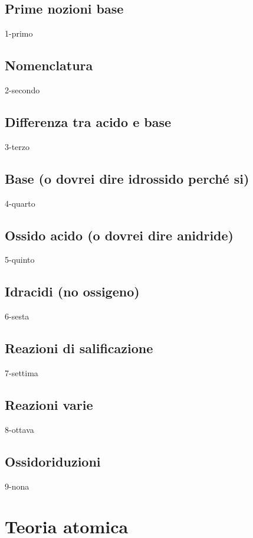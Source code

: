 \documentclass[openany,12pt]{book}%
\begin{document}
\section{Prime nozioni base}%
{1-primo}

\section{Nomenclatura}
{2-secondo}

\section{Differenza tra acido e base}
{3-terzo}

\section{Base (o dovrei dire idrossido perché si)}
{4-quarto}

\section{Ossido acido (o dovrei dire anidride)}
{5-quinto}

\section{Idracidi (no ossigeno)}
{6-sesta}

\section{Reazioni di salificazione}
{7-settima}

\section{Reazioni varie}
{8-ottava}

\section{Ossidoriduzioni}
{9-nona}

\chapter{Teoria atomica}
\end{document}
